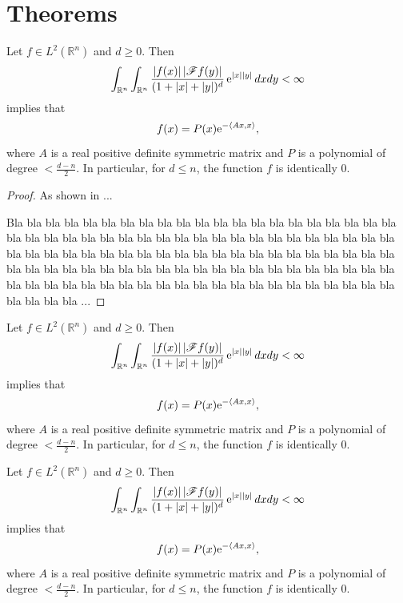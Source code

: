 \documentclass{amse}
\numberwithin{equation}{section}
\begin{document}
\section{Theorems}

\begin{thm}
Let $f\in L^{2}(\mathbb R^{n})$ and $d \geq
0$. Then
\begin{equation}
\int_{\mathbb R^{n}} \int_{\mathbb R^{n}} \frac{|f(x)|\,
|\mathscr{F}{f}(y)|}{(1+|x|+|y|)^{d}}\, {\rm e}^{|x||y|}\,dxdy <
\infty
\end{equation}
implies that
$$
f(x)=P(x){\rm e}^{-\langle Ax,x\rangle},
$$
where $A$ is a real positive definite symmetric matrix and $P$ is
a polynomial of degree $<\frac{d-n}{2}$. In particular, for $d\leq
n$, the function $f$ is identically $0.$
\end{thm}

\begin{proof}
As shown in ...

Bla bla bla bla bla bla bla bla bla bla bla bla bla bla bla bla bla bla bla bla bla bla
bla bla bla bla bla bla bla bla bla bla bla bla bla bla bla bla bla bla bla bla bla bla bla bla bla bla bla bla bla
bla bla bla bla bla bla bla bla bla bla bla bla bla bla bla bla bla bla bla bla bla bla bla bla bla bla bla bla bla
bla bla bla bla bla bla bla bla bla bla bla bla bla bla bla bla bla bla bla bla bla bla bla bla bla bla bla bla bla ...
\end{proof}



\begin{lem}
Let $f\in L^{2}(\mathbb R^{n})$ and $d \geq
0$. Then
\begin{equation}
\int_{\mathbb R^{n}} \int_{\mathbb R^{n}} \frac{|f(x)|\,
|\mathscr{F}{f}(y)|}{(1+|x|+|y|)^{d}}\, {\rm e}^{|x||y|}\,dxdy <
\infty
\end{equation}
implies that
$$
f(x)=P(x){\rm e}^{-\langle Ax,x\rangle},
$$
where $A$ is a real positive definite symmetric matrix and $P$ is
a polynomial of degree $<\frac{d-n}{2}$. In particular, for $d\leq
n$, the function $f$ is identically $0.$
\end{lem}


\begin{prop}
Let $f\in L^{2}(\mathbb R^{n})$ and $d \geq
0$. Then
\begin{equation}
\int_{\mathbb R^{n}} \int_{\mathbb R^{n}} \frac{|f(x)|\,
|\mathscr{F}{f}(y)|}{(1+|x|+|y|)^{d}}\, {\rm e}^{|x||y|}\,dxdy <
\infty
\end{equation}
implies that
$$
f(x)=P(x){\rm e}^{-\langle Ax,x\rangle},
$$
where $A$ is a real positive definite symmetric matrix and $P$ is
a polynomial of degree $<\frac{d-n}{2}$. In particular, for $d\leq
n$, the function $f$ is identically $0.$
\end{prop}
\end{document}
